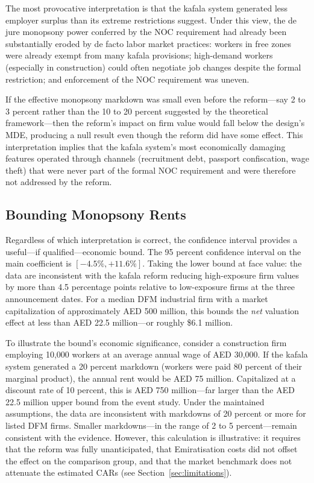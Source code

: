 \documentclass[12pt]{article}
\begin{document}
The most provocative interpretation is that the kafala system generated less employer surplus than its extreme restrictions suggest. Under this view, the de jure monopsony power conferred by the NOC requirement had already been substantially eroded by de facto labor market practices: workers in free zones were already exempt from many kafala provisions; high-demand workers (especially in construction) could often negotiate job changes despite the formal restriction; and enforcement of the NOC requirement was uneven.

If the effective monopsony markdown was small even before the reform---say 2 to 3 percent rather than the 10 to 20 percent suggested by the theoretical framework---then the reform's impact on firm value would fall below the design's MDE, producing a null result even though the reform did have some effect. This interpretation implies that the kafala system's most economically damaging features operated through channels (recruitment debt, passport confiscation, wage theft) that were never part of the formal NOC requirement and were therefore not addressed by the reform.

\subsection{Bounding Monopsony Rents}

Regardless of which interpretation is correct, the confidence interval provides a useful---if qualified---economic bound. The 95 percent confidence interval on the main coefficient is $[-4.5\%, +11.6\%]$. Taking the lower bound at face value: the data are inconsistent with the kafala reform reducing high-exposure firm values by more than 4.5 percentage points relative to low-exposure firms at the three announcement dates. For a median DFM industrial firm with a market capitalization of approximately AED 500 million, this bounds the \emph{net} valuation effect at less than AED 22.5 million---or roughly \$6.1 million.

To illustrate the bound's economic significance, consider a construction firm employing 10,000 workers at an average annual wage of AED 30,000. If the kafala system generated a 20 percent markdown (workers were paid 80 percent of their marginal product), the annual rent would be AED 75 million. Capitalized at a discount rate of 10 percent, this is AED 750 million---far larger than the AED 22.5 million upper bound from the event study. Under the maintained assumptions, the data are inconsistent with markdowns of 20 percent or more for listed DFM firms. Smaller markdowns---in the range of 2 to 5 percent---remain consistent with the evidence. However, this calculation is illustrative: it requires that the reform was fully unanticipated, that Emiratisation costs did not offset the effect on the comparison group, and that the market benchmark does not attenuate the estimated CARs (see Section~\ref{sec:limitations}).
\end{document}
